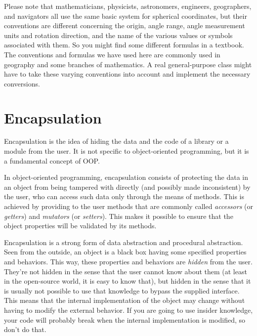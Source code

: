 Please note that mathematicians, physicists, astronomers, 
engineers, geographers, and navigators all use the same basic system 
for spherical coordinates, but their conventions are different 
concerning the origin, angle range, angle measurement 
units and rotation direction, and the name of the various 
values or symbols associated with them. So you might find 
some different formulas in a textbook. The conventions and 
formulas we have used here are commonly used in geography and 
some branches of mathematics. A real general-purpose class 
might have to take these varying conventions into account and 
implement the necessary conversions.

\section{Encapsulation}

Encapsulation is the idea of hiding the data and the code 
of a library or a module from the user. It is not specific to 
object-oriented programming, but it is a fundamental concept 
of OOP.

In object-oriented programming, encapsulation consists of 
protecting the data in an object from being tampered with 
directly (and possibly made inconsistent) 
by the user, who can access such data only through
the means of methods. This is achieved by providing to the 
user methods that are commonly called \emph{accessors} (or 
\emph{getters}) and \emph{mutators} (or \emph{setters}). This 
makes it possible to ensure that the object properties will 
be validated by its methods.

Encapsulation is a strong form of data abstraction and 
procedural abstraction. Seen from the outside, an object 
is a black box having some specified properties and 
behaviors. This way, these properties and behaviors are 
\emph{hidden} from the user. They're not hidden in the 
sense that the user cannot know about them (at least in 
the open-source world, it is easy to know that), but 
hidden in the sense that it is usually not possible to 
use that knowledge to bypass the supplied interface. This 
means that the internal implementation of the object may 
change without having to modify the external behavior. If you 
are going to use insider knowledge, your code will 
probably break when the internal implementation is 
modified, so don't do that.

